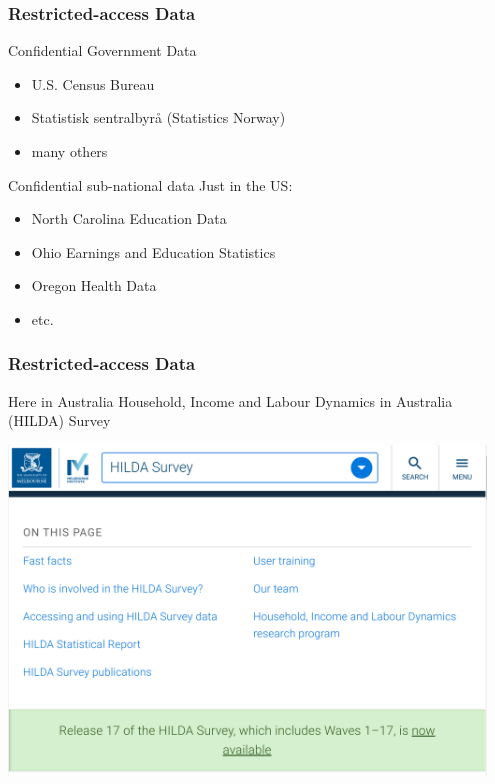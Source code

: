 \begin{frame}
\frametitle{Restricted-access Data}
\begin{block}{Confidential Government Data}
	\begin{itemize}
		\item U.S. Census Bureau
		\item Statistisk sentralbyrå (Statistics Norway)
		\item many others
	\end{itemize}
\end{block}

\begin{block}{Confidential sub-national data}
	Just in the US:
	\begin{itemize}
		\item North Carolina Education Data
		\item Ohio Earnings and Education Statistics
		\item Oregon Health Data
		\item etc.
	\end{itemize}
\end{block}
\end{frame}

\begin{frame}
\frametitle{Restricted-access Data}
\begin{block}{Here in Australia}
Household, Income and Labour Dynamics in Australia (HILDA) Survey \textellipsis
\end{block}
\begin{center}
\includegraphics[width=0.95\textwidth]{images/hilda-screenshot1.png}
\end{center}
\end{frame}

